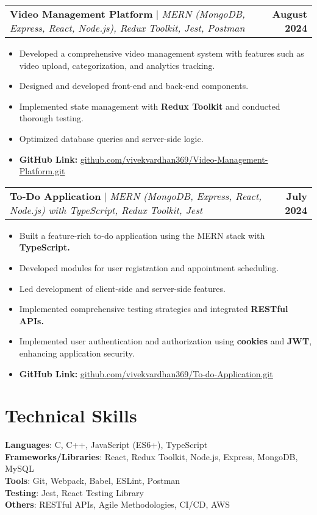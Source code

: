\documentclass[letterpaper,11pt]{article}
\makeatletter
\newcommand{\resumeItem}[1]{
  \item\small{
    {#1 \vspace{-2pt}}
  }
}
\newcommand{\resumeProjectHeading}[2]{
    \item
    \begin{tabular*}{1.001\textwidth}{l@{\extracolsep{\fill}}r}
      \small#1 & \textbf{\small #2}\\
    \end{tabular*}\vspace{-7pt}
}
\newcommand{\resumeItemListStart}{\begin{itemize}}
\newcommand{\resumeItemListEnd}{\end{itemize}\vspace{-5pt}}
\makeatother
\begin{document}
    
\resumeProjectHeading
    {\textbf{Video Management Platform} $|$ \emph{MERN (MongoDB, Express, React, Node.js), Redux Toolkit, Jest, Postman}}{August 2024}
    \resumeItemListStart
        \resumeItem{Developed a comprehensive video management system with features such as video upload, categorization, and analytics tracking.}
        \resumeItem{Designed and developed front-end and back-end components.}
        \resumeItem{Implemented state management with \textbf{Redux Toolkit} and conducted thorough testing.}
        \resumeItem{Optimized database queries and server-side logic.}
        \resumeItem{\textbf{GitHub Link:} \href{https://github.com/vivekvardhan369/Video-Management-Platform.git}{\underline{github.com/vivekvardhan369/Video-Management-Platform.git}}}
    \resumeItemListEnd
    \vspace{-16pt}



    
\resumeProjectHeading
    {\textbf{To-Do Application} $|$ \emph{MERN (MongoDB, Express, React, Node.js) with TypeScript, Redux Toolkit, Jest}}{July 2024}
    \resumeItemListStart
        \resumeItem{Built a feature-rich to-do application using the MERN stack with \textbf{TypeScript.}}
        \resumeItem{Developed modules for user registration and appointment scheduling.}
        \resumeItem{Led development of client-side and server-side features.}
        \resumeItem{Implemented comprehensive testing strategies and integrated \textbf{RESTful APIs.}}
        \resumeItem{Implemented user authentication and authorization using \textbf{cookies} and \textbf{JWT}, enhancing application security.}
        \resumeItem{\textbf{GitHub Link:} \href{https://github.com/vivekvardhan369/To-do-Application.git}{\underline{github.com/vivekvardhan369/To-do-Application.git}}}
    \resumeItemListEnd
    \vspace{-16pt}




\section{Technical Skills}
 \begin{itemize}[leftmargin=0.15in, label={}]
    \small{
      \item{
        \textbf{Languages}{: C, C++, JavaScript (ES6+), TypeScript} \\
        \textbf{Frameworks/Libraries}{: React, Redux Toolkit, Node.js, Express, MongoDB, MySQL} \\
        \textbf{Tools}{: Git, Webpack, Babel, ESLint, Postman} \\
        \textbf{Testing}{: Jest, React Testing Library} \\
        \textbf{Others}{: RESTful APIs, Agile Methodologies, CI/CD, AWS} \\
      }
    }
 \end{itemize}
 \vspace{-16pt}
\end{document}
